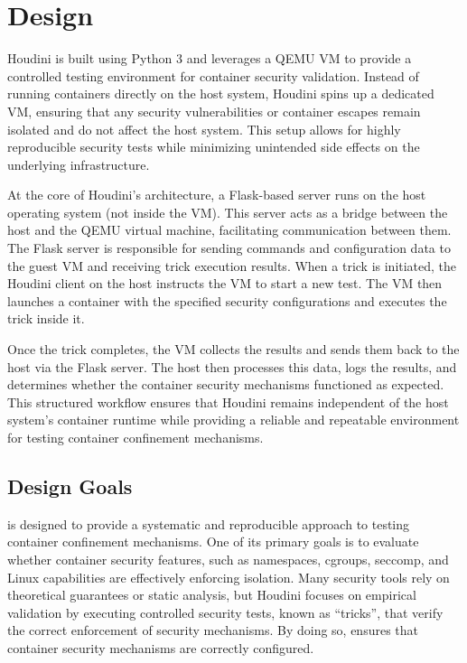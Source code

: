 \section{Design}

Houdini is built using Python 3 and leverages a QEMU VM to provide a controlled testing environment for container security validation. Instead of running containers directly on the host system, Houdini spins up a dedicated VM, ensuring that any security vulnerabilities or container escapes remain isolated and do not affect the host system. This setup allows for highly reproducible security tests while minimizing unintended side effects on the underlying infrastructure.  

At the core of Houdini’s architecture, a Flask-based server runs on the host operating system (not inside the VM). This server acts as a bridge between the host and the QEMU virtual machine, facilitating communication between them. The Flask server is responsible for sending commands and configuration data to the guest VM and receiving trick execution results. When a trick is initiated, the Houdini client on the host instructs the VM to start a new test. The VM then launches a container with the specified security configurations and executes the trick inside it.  

Once the trick completes, the VM collects the results and sends them back to the host via the Flask server. The host then processes this data, logs the results, and determines whether the container security mechanisms functioned as expected. This structured workflow ensures that Houdini remains independent of the host system’s container runtime while providing a reliable and repeatable environment for testing container confinement mechanisms.

\label{sec:design}

\subsection{Design Goals}

\houdini is designed to provide a systematic and reproducible approach to testing container confinement mechanisms. One of its primary goals is to evaluate whether container security features, such as namespaces, cgroups, seccomp, and Linux capabilities are effectively enforcing isolation. Many security tools rely on theoretical guarantees or static analysis, but Houdini focuses on empirical validation by executing controlled security tests, known as \enquote{tricks}, that verify the correct enforcement of security mechanisms. By doing so, \houdini ensures that container security mechanisms are correctly configured.

